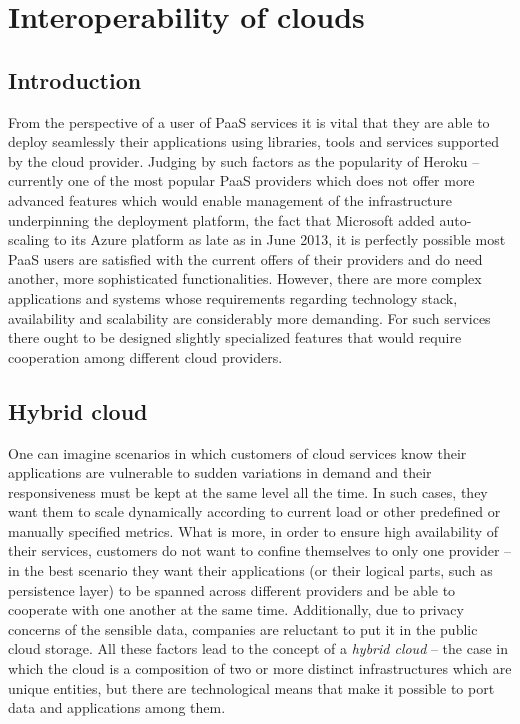 \chapter{Interoperability of clouds}


\section{Introduction}
From the perspective of a user of PaaS services it is vital that they are able to deploy seamlessly their applications using libraries, tools and services supported by the cloud provider\cite{MeGr11}. Judging by such factors as the popularity of Heroku -- currently one of the most popular PaaS providers which does not offer more advanced features which would enable management of the infrastructure underpinning the deployment platform, the fact that Microsoft added auto-scaling to its Azure platform as late as in June 2013, it is perfectly possible most PaaS users are satisfied with the current offers of their providers and do need another, more sophisticated functionalities. However, there are more complex applications and systems whose requirements regarding technology stack, availability and scalability are considerably more demanding. For such services there ought to be designed slightly specialized features that would require cooperation among different cloud providers.

\section{Hybrid cloud}
One can imagine scenarios in which customers of cloud services know their applications are vulnerable to sudden variations in demand and their responsiveness must be kept at the same level all the time. In such cases, they want them to scale dynamically according to current load or other predefined or manually specified metrics. What is more, in order to ensure high availability of their services, customers do not want to confine themselves to only one provider -- in the best scenario they want their applications (or their logical parts, such as persistence layer) to be spanned across different providers and be able to cooperate with one another at the same time. Additionally, due to privacy concerns of the sensible data, companies are reluctant to put it in the public cloud storage. All these factors lead to the concept of a \emph{hybrid cloud}\cite{MeGr11} -- the case in which the cloud is a composition of two or more distinct infrastructures which are unique entities, but there are technological means that make it possible to port data and applications among them.

